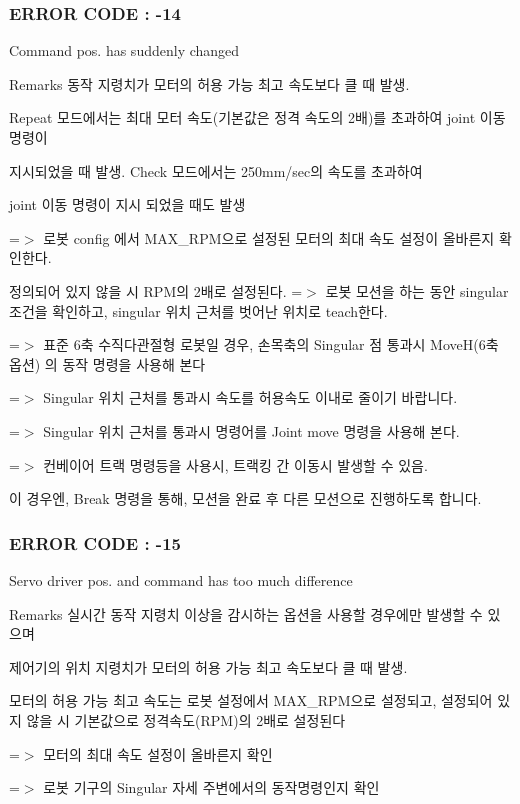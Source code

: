  \subsubsection*{E\-R\-R\-O\-R C\-O\-D\-E \-: -\/14 }

Command pos. has suddenly changed \begin{DoxyRemark}{Remarks}
동작 지령치가 모터의 허용 가능 최고 속도보다 클 때 발생. \par
 Repeat 모드에서는 최대 모터 속도(기본값은 정격 속도의 2배)를 초과하여 joint 이동 명령이 \par
 지시되었을 때 발생. Check 모드에서는 250mm/sec의 속도를 초과하여 \par
 joint 이동 명령이 지시 되었을 때도 발생 \par
 \par
 =$>$ 로봇 config 에서 M\-A\-X\-\_\-\-R\-P\-M으로 설정된 모터의 최대 속도 설정이 올바른지 확인한다. \par
 정의되어 있지 않을 시 R\-P\-M의 2배로 설정된다. =$>$ 로봇 모션을 하는 동안 singular 조건을 확인하고, singular 위치 근처를 벗어난 위치로 teach한다. \par
 =$>$ 표준 6축 수직다관절형 로봇일 경우, 손목축의 Singular 점 통과시 Move\-H(6축 옵션) 의 동작 명령을 사용해 본다 \par
 =$>$ Singular 위치 근처를 통과시 속도를 허용속도 이내로 줄이기 바랍니다. \par
 =$>$ Singular 위치 근처를 통과시 명령어를 Joint move 명령을 사용해 본다. \par
 =$>$ 컨베이어 트랙 명령등을 사용시, 트랙킹 간 이동시 발생할 수 있음. \par
 이 경우엔, Break 명령을 통해, 모션을 완료 후 다른 모션으로 진행하도록 합니다.
\end{DoxyRemark}


 \subsubsection*{E\-R\-R\-O\-R C\-O\-D\-E \-: -\/15 }

Servo driver pos. and command has too much difference \begin{DoxyRemark}{Remarks}
실시간 동작 지령치 이상을 감시하는 옵션을 사용할 경우에만 발생할 수 있으며\par
 제어기의 위치 지령치가 모터의 허용 가능 최고 속도보다 클 때 발생. \par
 모터의 허용 가능 최고 속도는 로봇 설정에서 M\-A\-X\-\_\-\-R\-P\-M으로 설정되고, 설정되어 있지 않을 시 기본값으로 정격속도(\-R\-P\-M)의 2배로 설정된다 \par
 =$>$ 모터의 최대 속도 설정이 올바른지 확인 \par
 =$>$ 로봇 기구의 Singular 자세 주변에서의 동작명령인지 확인
\end{DoxyRemark}


